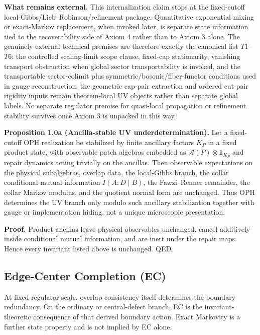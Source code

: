 \textbf{What remains external.} This internalization claim stops at the fixed-cutoff local-Gibbs/Lieb--Robinson/refinement package. Quantitative exponential mixing or exact-Markov replacement, when invoked later, is separate state information tied to the recoverability side of Axiom 4 rather than to Axiom 3 alone. The genuinely external technical premises are therefore exactly the canonical list \(T1\)--\(T6\): the controlled scaling-limit scope clause, fixed-cap stationarity, vanishing transport obstruction when global sector transportability is invoked, and the transportable sector-colimit plus symmetric/bosonic/fiber-functor conditions used in gauge reconstruction; the geometric cap-pair extraction and ordered cut-pair rigidity inputs remain theorem-local UV objects rather than separate global labels. No separate regulator premise for quasi-local propagation or refinement stability survives once Axiom 3 is unpacked in this way.

\textbf{Proposition 1.0a (Ancilla-stable UV underdetermination).} Let a fixed-cutoff OPH realization be stabilized by finite ancillary factors \(K_P\) in a fixed product state, with observable patch algebras embedded as \(\mathcal A(P)\otimes \mathbf 1_{K_P}\) and repair dynamics acting trivially on the ancillas. Then observable expectations on the physical subalgebras, overlap data, the local-Gibbs branch, the collar conditional mutual information \(I(A:D\mid B)\), the Fawzi--Renner remainder, the collar Markov modulus, and the quotient normal form are unchanged. Thus OPH determines the UV branch only modulo such ancillary stabilization together with gauge or implementation hiding, not a unique microscopic presentation.

\textbf{Proof.} Product ancillas leave physical observables unchanged, cancel additively inside conditional mutual information, and are inert under the repair maps. Hence every invariant listed above is unchanged. QED.

\subsection{Edge-Center Completion (EC)}\label{13-edge-center-completion-ec}

At fixed regulator scale, overlap consistency itself determines the boundary redundancy. On the
ordinary or central-defect branch, EC is the invariant-theoretic consequence of that derived
boundary action. Exact Markovity is a further state property and is not implied by EC alone.

